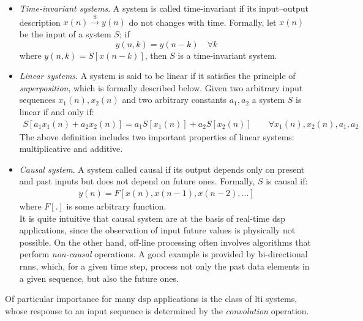 \begin{itemize}
	\item \textit{Time-invariant systems}. A system is called time-invariant if its input–output description $x(n) \xrightarrow{\text{S}} y(n)$ do not changes with time. Formally, let $x(n)$ be the input of a system $S$; if 
	$$y(n, k) = y(n - k) \quad \forall k$$
	where  $y(n, k) = S[x(n-k)]$, then $S$ is a time-invariant system. 
	\item \textit{Linear systems}. A system is said to be linear if it satisfies the principle of \textit{superposition}, which is formally described below. Given two arbitrary input sequences $x_1(n), x_2(n)$ and two arbitrary constants $a_1, a_2$ a system $S$ is linear if and only if:
	\begin{align}
		S[a_1x_1(n) + a_2x_2(n)] = a_1S[x_1(n)] + a_2S[x_2(n)] \qquad \forall x_1(n), x_2(n), a_1, a_2 
	\end{align}
	The above definition includes two important properties of linear systems: multiplicative and additive.
	\item \textit{Causal system}. A system called causal if its output depends only on present and past inputs	but does not depend on future ones. Formally, $S$ is causal if: 
	\begin{align}
		y(n) = F[x(n), x(n-1), x(n-2), ...]
	\end{align}
	where $F[.]$ is some arbitrary function. \\
	It is quite intuitive that causal system are at the basis of real-time \gls{dsp} applications, since the observation of input future values is  physically not possible. On the other hand, off-line processing often involves algorithms that perform \textit{non-causal} operations. A good example is provided by bi-directional \gls{rnn}s, which, for a given time step, process not only the past data elements in a given sequence, but also the future ones. 
\end{itemize}

\noindent Of particular importance for many \gls{dsp} applications is the class of \gls{lti} systems, whose response to an input sequence is determined by the \textit{convolution} operation. 


